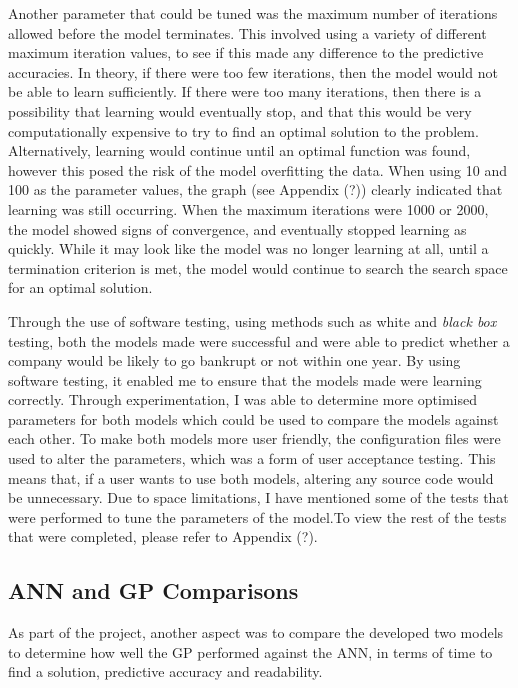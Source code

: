 \documentclass[11pt]{article}
\begin{document}
Another parameter that could be tuned was the maximum number of iterations allowed before the model terminates. This involved using a variety of different maximum iteration values, to see if this made any difference to the predictive accuracies. In theory, if there were too few iterations, then the model would not be able to learn sufficiently. If there were too many iterations, then there is a possibility that learning would eventually stop, and that this would be very computationally expensive to try to find an optimal solution to the problem. Alternatively, learning would continue until an optimal function was found, however this posed the risk of the model overfitting the data. When using 10 and 100 as the parameter values, the graph (see Appendix (?)) clearly indicated that learning was still occurring. When the maximum iterations were 1000 or 2000, the model showed signs of convergence, and eventually stopped learning as quickly. While it may look like the model was no longer learning at all, until a termination criterion is met, the model would continue to search the search space for an optimal solution.

Through the use of software testing, using methods such as white and \textit{black box} testing, both the models made were successful and were able to predict whether a company would be likely to go bankrupt or not within one year. By using software testing, it enabled me to ensure that the models made were learning correctly. Through experimentation, I was able to determine more optimised parameters for both models which could be used to compare the models against each other. To make both models more user friendly, the configuration files were used to alter the parameters, which was a form of user acceptance testing. This means that, if a user wants to use both models, altering any source code would be unnecessary. Due to space limitations, I have mentioned some of the tests that were performed to tune the parameters of the model.To view the rest of the tests that were completed, please refer to Appendix (?).
\subsection{ANN and GP Comparisons}\label{subsec:ANNGPC}
As part of the project, another aspect was to compare the developed two models to determine how well the GP performed against the ANN, in terms of time to find a solution, predictive accuracy and readability. \\
\end{document}
